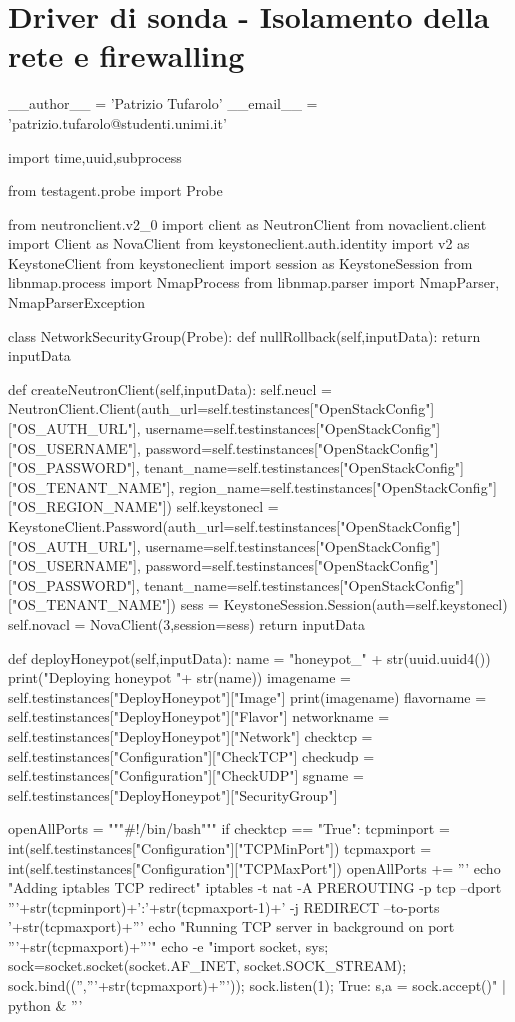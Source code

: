 \appendix
\chapter{Driver di sonda - Isolamento della rete e firewalling}
\begin{python}
__author__ = 'Patrizio Tufarolo'
__email__ = 'patrizio.tufarolo@studenti.unimi.it'


import time,uuid,subprocess

from testagent.probe import Probe

from neutronclient.v2_0 import client as NeutronClient
from novaclient.client import Client as NovaClient
from keystoneclient.auth.identity import v2 as KeystoneClient
from keystoneclient import session as KeystoneSession
from libnmap.process import NmapProcess
from libnmap.parser import NmapParser, NmapParserException

class NetworkSecurityGroup(Probe):
	def nullRollback(self,inputData):
		return inputData

	def createNeutronClient(self,inputData):
		self.neucl = NeutronClient.Client(auth_url=self.testinstances["OpenStackConfig"]["OS_AUTH_URL"],
						username=self.testinstances["OpenStackConfig"]["OS_USERNAME"],
						password=self.testinstances["OpenStackConfig"]["OS_PASSWORD"],
						tenant_name=self.testinstances["OpenStackConfig"]["OS_TENANT_NAME"],
						region_name=self.testinstances["OpenStackConfig"]["OS_REGION_NAME"])
		self.keystonecl = KeystoneClient.Password(auth_url=self.testinstances["OpenStackConfig"]["OS_AUTH_URL"],
						username=self.testinstances["OpenStackConfig"]["OS_USERNAME"],
						password=self.testinstances["OpenStackConfig"]["OS_PASSWORD"],
						tenant_name=self.testinstances["OpenStackConfig"]["OS_TENANT_NAME"])
		sess = KeystoneSession.Session(auth=self.keystonecl)
		self.novacl = NovaClient(3,session=sess)
		return inputData


	def deployHoneypot(self,inputData):
		name = "honeypot_" + str(uuid.uuid4())
		print("Deploying honeypot "+ str(name))
		imagename = self.testinstances["DeployHoneypot"]["Image"]
		print(imagename)
		flavorname = self.testinstances["DeployHoneypot"]["Flavor"]
		networkname = self.testinstances["DeployHoneypot"]["Network"]
		checktcp = self.testinstances["Configuration"]["CheckTCP"]
		checkudp = self.testinstances["Configuration"]["CheckUDP"]
		sgname = self.testinstances["DeployHoneypot"]["SecurityGroup"]

		openAllPorts = """#!/bin/bash\n"""
		if checktcp == "True":
			tcpminport = int(self.testinstances["Configuration"]["TCPMinPort"])
			tcpmaxport = int(self.testinstances["Configuration"]["TCPMaxPort"])
			openAllPorts += '''
			echo "Adding iptables TCP redirect\n"
			iptables -t nat -A PREROUTING -p tcp --dport '''+str(tcpminport)+':'+str(tcpmaxport-1)+' -j REDIRECT --to-ports '+str(tcpmaxport)+'''\n
			echo "Running TCP server in background on port '''+str(tcpmaxport)+'''\n"
			echo -e "import socket, sys; sock=socket.socket(socket.AF_INET, socket.SOCK_STREAM); sock.bind(('','''+str(tcpmaxport)+''')); sock.listen(1); \nwhile True: s,a = sock.accept()\n" | python &
			\n'''


\end{python}

